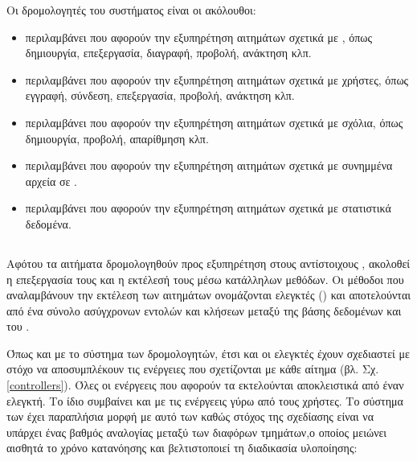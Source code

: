 Οι δρομολογητές του συστήματος είναι οι ακόλουθοι:

\begin{itemize}
    \item {} περιλαμβάνει  που αφορούν την εξυπηρέτηση αιτημάτων σχετικά με , όπως δημιουργία, επεξεργασία, διαγραφή, προβολή, ανάκτηση κλπ.
    \item {} περιλαμβάνει  που αφορούν την εξυπηρέτηση αιτημάτων σχετικά με χρήστες, όπως εγγραφή, σύνδεση, επεξεργασία, προβολή, ανάκτηση κλπ.
    \item {} περιλαμβάνει  που αφορούν την εξυπηρέτηση αιτημάτων σχετικά με σχόλια, όπως δημιουργία, προβολή, απαρίθμηση κλπ.
    \item {} περιλαμβάνει  που αφορούν την εξυπηρέτηση αιτημάτων σχετικά με συνημμένα αρχεία σε .
    \item {} περιλαμβάνει  που αφορούν την εξυπηρέτηση αιτημάτων σχετικά με στατιστικά δεδομένα.
\end{itemize}

\subsection{}

Αφότου τα αιτήματα δρομολογηθούν προς εξυπηρέτηση στους αντίστοιχους , ακολοθεί η επεξεργασία τους και η εκτέλεσή τους μέσω κατάλληλων μεθόδων. Οι μέθοδοι που αναλαμβάνουν την εκτέλεση των αιτημάτων ονομάζονται ελεγκτές () και αποτελούνται από ένα σύνολο ασύγχρονων εντολών και κλήσεων μεταξύ της βάσης δεδομένων και του .

Όπως και με το σύστημα των δρομολογητών, έτσι και οι ελεγκτές έχουν σχεδιαστεί με στόχο να αποσυμπλέκουν τις ενέργειες που σχετίζονται με κάθε αίτημα (βλ. Σχ. \ref{controllers}). Όλες οι ενέργεεις που αφορούν τα  εκτελούνται αποκλειστικά από έναν ελεγκτή. Το ίδιο συμβαίνει και με τις ενέργεεις γύρω από τους χρήστες. Το σύστημα των  έχει παραπλήσια μορφή με αυτό των  καθώς στόχος της σχεδίασης είναι να υπάρχει ένας βαθμός αναλογίας μεταξύ των διαφόρων τμημάτων,ο οποίος μειώνει αισθητά το χρόνο κατανόησης και βελτιστοποιεί τη διαδικασία υλοποίησης:

